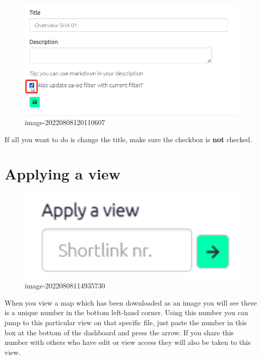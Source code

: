 \documentclass[
]{book}
\begin{document}
\begin{figure}
\centering
\includegraphics[width=6.77083in,height=\textheight]{_assets/image-20220808120110607.png}
\caption{image-20220808120110607}
\end{figure}

If all you want to do is change the title, make sure the checkbox is \textbf{not} checked.

\hypertarget{applying-a-view}{%
\section{Applying a view}\label{applying-a-view}}

\begin{figure}
\centering
\includegraphics[width=6.77083in,height=\textheight]{_assets/image-20220808114935730.png}
\caption{image-20220808114935730}
\end{figure}

When you view a map which has been downloaded as an image you will see there is a unique number in the bottom left-hand corner. Using this number you can jump to this particular view on that specific file, just paste the number in this box at the bottom of the dashboard and press the arrow. If you share this number with others who have edit or view access they will also be taken to this view.
\end{document}
